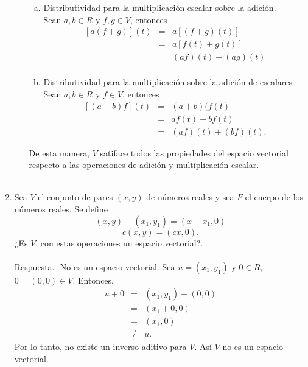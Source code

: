 \begin{enumerate}[\bfseries 1.]
\begin{enumerate}[(1)]
\begin{enumerate}[(a)]
		    \item Distributividad para la multiplicación escalar sobre la adición.\\
			Sean $a,b\in R$ y $f,g\in V$, entonces
			$$
			\begin{array}{rcl}
			    \left[a\left(f+g\right)\right](t) &=& a\left[(f+g)(t)\right]\\
							      &=& a\left[f(t)+g(t)\right]\\
							      &=& \left(af\right)(t)+\left(ag\right)(t)\\
			\end{array}
			$$

		    \item Distributividad para la multiplicación sobre la adición de escalares\\
			Sean $a,b\in R$ y $f\in V$, entonces
			$$
			\begin{array}{rcl}
			    \left[(a+b)f\right](t)&=& (a+b)(f(t)\\
						  &=& af(t)+bf(t)\\
						  &=& (af)(t)+(bf)(t).
			\end{array}
			$$

		\end{enumerate}
		De esta manera, $V$ satiface todos las propiedades del espacio vectorial respecto a las operaciones de adición y multiplicación escalar.\\\\

	\end{enumerate}

    \item Sea $V$ el conjunto de pares $(x,y)$ de números reales y sea $F$ el cuerpo de los números reales. Se define
    $$(x,y)+(x_1,y_1)=(x+x_1,0)$$
    $$c(x,y)=(cx,0).$$
    ¿Es $V$, con estas operaciones un espacio vectorial?.\\\\
	Respuesta.-\; No es un espacio vectorial. Sea $u=(x_1,y_1)$ y  $0\in R$, $0=(0,0)\in V$. Entonces,
	$$
	\begin{array}{rcl}
	    u+0&=&(x_1,y_1)+(0,0)\\
	      &=&(x_1+0,0)\\
	      &=&(x_1,0)\\
	      &\neq& u.
	\end{array}
	$$
	Por lo tanto, no existe un inverso aditivo para $V$. Así $V$ no es un espacio vectorial.

\end{enumerate}



